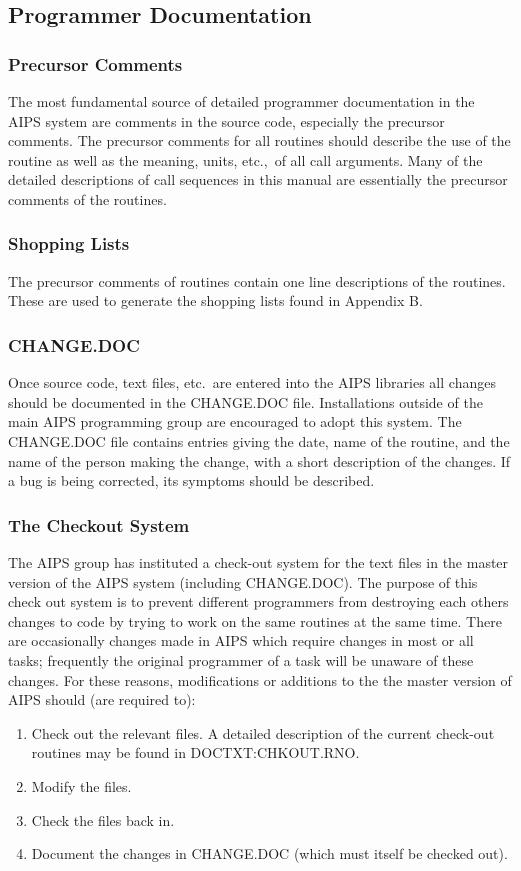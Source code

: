 \subsection{Programmer Documentation }
\subsubsection{Precursor Comments }
The most fundamental source of detailed programmer documentation in
the AIPS system are comments in the source code, especially the
precursor comments.  The precursor
comments for all routines should describe the use of the routine as
well as the meaning, units, etc.,~of all call arguments. Many of the
detailed descriptions of call sequences in this manual are essentially
the precursor comments of the routines.

\subsubsection{Shopping Lists }
The precursor comments of routines contain one line descriptions of
the routines.  These are used to generate the shopping lists found in
Appendix B.

\subsubsection{CHANGE.DOC }
Once source code, text files, etc.~are entered into the AIPS libraries
all changes should be documented in the CHANGE.DOC file. Installations
outside of the main AIPS programming group are encouraged to adopt
this system.  The CHANGE.DOC file contains entries giving the date,
name of the routine, and the name of the person making the change,
with a short description of the changes.  If a bug is being corrected,
its symptoms should be described.

\subsubsection{The Checkout System }
The AIPS group has instituted a check-out system for the text files in
the master version of the AIPS system (including CHANGE.DOC).  The
purpose of this check out system is to prevent different programmers
from destroying each others changes to code by trying to work on the
same routines at the same time.  There are occasionally changes made
in AIPS which require changes in most or all tasks; frequently the
original programmer of a task will be unaware of these changes.  For
these reasons, modifications or additions to the the master version of
AIPS should (are required to):
\begin{enumerate} %
\item Check out the relevant files.  A detailed description of the current
check-out routines may be found in DOCTXT:CHKOUT.RNO.
\item Modify the files.
\item Check the files back in.
\item Document the changes in CHANGE.DOC (which must itself be checked out).
\end{enumerate} %

